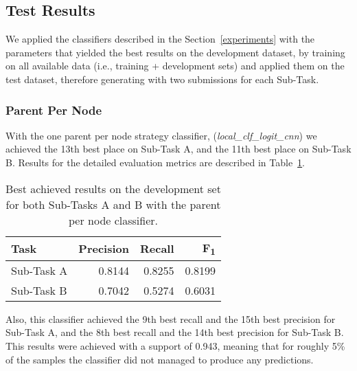\documentclass[11pt,a4paper]{article}
\begin{document}
\subsection{Test Results}

We applied the classifiers described in the Section~\ref{experiments} with the
parameters that yielded the best results on the development dataset, by training
on all available data (i.e., training + development sets) and applied them
on the test dataset, therefore generating with two submissions for each Sub-Task.

\subsubsection{Parent Per Node}

With the one parent per node strategy classifier, (\textit{local\_clf\_logit\_cnn})
we achieved the 13th best place on Sub-Task A, and the 11th best place on
Sub-Task B. Results for the detailed evaluation metrics are described in
Table~\ref{local_devset-results}.

\begin{table}[!h]
\begin{center}
\begin{tabular}{|l|r|r|r|}
\hline\centering\textbf{Task}  & \textbf{Precision} &  \textbf{Recall} &  \textbf{F\textsubscript{1}}\\
\hline
 Sub-Task A   &  0.8144 & 0.8255 & 0.8199 \\
 Sub-Task B   &  0.7042 & 0.5274 & 0.6031 \\
\hline
\end{tabular}
\end{center}
\caption{\label{local_devset-results} Best achieved results on the development
          set for both Sub-Tasks A and B with the parent per node classifier.}
\end{table}

Also, this classifier achieved the 9th best recall and the 15th best precision
for Sub-Task A, and the 8th best recall and the 14th best precision for Sub-Task B.
This results were achieved with a support of 0.943, meaning that for
roughly 5\% of the samples the classifier did not managed to produce any
predictions.
\end{document}
